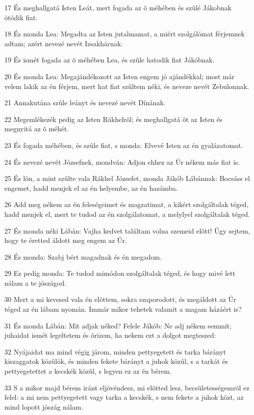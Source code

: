 \par 17 És meghallgatá Isten Leát, mert fogada az õ méhében és szûlé Jákobnak ötödik fiat.
\par 18 És monda Lea: Megadta az Isten jutalmamat, a miért szolgálómat férjemnek adtam; azért nevezé nevét Izsakhárnak.
\par 19 És ismét fogada az õ méhében Lea, és szûle hatodik fiat Jákóbnak.
\par 20 És monda Lea: Megajándékozott az Isten engem jó ajándékkal; most már velem lakik az én férjem, mert hat fiat szûltem néki, és neveze nevét Zebulonnak.
\par 21 Annakutána szûle leányt és nevezé nevét Dínának.
\par 22 Megemlékezék pedig az Isten Rákhelrõl; és meghallgatá õt az Isten és megnyitá az õ méhét.
\par 23 És fogada méhében, és szûle fiat, s monda: Elvevé Isten az én gyalázatomat.
\par 24 És nevezé nevét Józsefnek, mondván: Adjon ehhez az Úr nékem más fiat is.
\par 25 És lõn, a mint szûlte vala Rákhel Józsefet, monda Jákób Lábánnak: Bocsáss el engemet, hadd menjek el az én helyembe, az én hazámba.
\par 26 Add meg nékem az én feleségeimet és magzatimat, a kikért szolgáltalak téged, hadd menjek el, mert te tudod az én szolgálatomat, a melylyel szolgáltalak téged.
\par 27 És monda néki Lábán: Vajha kedvet találtam volna szemeid elõtt! Úgy sejtem, hogy te éretted áldott meg engem az Úr.
\par 28 És monda: Szabj bért magadnak és én megadom.
\par 29 Ez pedig monda: Te tudod mimódon szolgáltalak téged, és hogy mivé lett nálam a te jószágod.
\par 30 Mert a mi kevesed vala én elõttem, sokra szaporodott, és megáldott az Úr téged az én lábam nyomán. Immár mikor tehetek valamit a magam házáért is?
\par 31 És monda Lábán: Mit adjak néked? Felele Jákób: Ne adj nékem semmit; juhaidat ismét legeltetem és õrizem, ha nekem ezt a dolgot megteszed:
\par 32 Nyájaidat ma mind végig járom, minden pettyegetett és tarka bárányt kiszaggatok közûlök, és minden fekete bárányt a juhok közûl, s a tarkát és pettyegetettet a kecskék közûl, s legyen ez az én bérem.
\par 33 S a mikor majd bérem iránt eljövéndesz, mi elõtted lesz, becsületességemrõl ez felel: a mi nem pettyegetett vagy tarka a kecskék, s nem fekete a juhok közt, az mind lopott jószág nálam.
